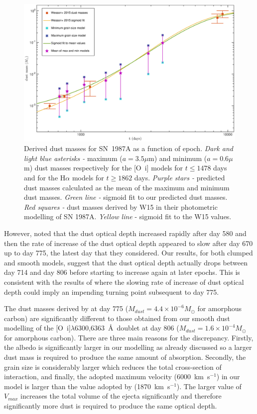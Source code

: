 \documentclass[useAMS,usenatbib,usegraphicx]{mnras}
\begin{document}
\begin{figure}
\begin{center}
\includegraphics[trim =120 30 105 15,clip=true,scale=0.51]{Mdust_evol3}
\caption{Derived dust masses for SN~1987A as a function of epoch.  \textit{Dark and light blue asterisks -} maximum ($a=3.5\mu$m) and 
minimum ($a=0.6\mu$m) dust masses respectively for the [O~{\sc i}] models for $t \le 1478$ days and for the H$\alpha$ models for $t \ge 1862$ days. \textit{Purple 
stars -} predicted dust masses calculated as the mean of the maximum and minimum dust masses.
\textit{Green line -} sigmoid fit 
to our predicted dust masses. \textit{Red squares -} dust masses derived by W15 
in their photometric modelling of SN 1987A. \textit{Yellow line} - sigmoid fit to 
the W15 values.}
\label{Mdust}
\end{center}
\end{figure}

However, \citet{Lucy1989} noted that the dust optical depth increased rapidly after day 580 and then the rate of increase of the dust optical depth appeared to slow after day 670 up to day 775, the latest day that they considered.  Our results, for both clumped and smooth models, suggest that the dust optical depth actually drops between day 714 and day 806 before starting to increase again at later epochs.  This is consistent with the results of \citet{Lucy1989} where the slowing rate of increase of dust optical depth could imply an impending turning point subsequent to day 775.  

The dust masses derived by \citet{Lucy1989} at day 775 ($M_{dust}=4.4 \times 10^{-6} M_{\odot}$ for amorphous carbon) are significantly different to those obtained from our smooth dust modelling of the [O~{\sc i}]$\lambda$6300,6363~\AA\ doublet at day 806 ($M_{dust}=1.6 \times 10^{-4} M_{\odot}$ for amorphous carbon).  There are three main reasons for the discrepancy.  Firstly, the albedo is significantly larger in our modelling as already discussed so a larger dust mass is required to produce the same amount of absorption.  Secondly, the grain size is considerably larger which reduces the total cross-section of interaction, and finally, the adopted maximum velocity (6000~km~s$^{-1}$) in our model is larger than the value adopted by \citet{Lucy1989} (1870~km~s$^{-1}$).  The larger value of $V_{max}$ increases the total volume of the ejecta significantly and therefore significantly more dust is required to produce the same optical depth.
\end{document}
